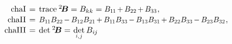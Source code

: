 \vspace{-0.25em}
\begin{equation}\label{invariants:2}
\begin{array}{r@{\hspace{.4em}}c@{\hspace{.4em}}l}
\firstcharacteristicinvariant
& = &
\trace{\somebivalenttensor} = \somebivalenttensorcomponents{kk}
= \scalebox{.92}[.96]{$%
\somebivalenttensorcomponents{1\hspace{-0.1ex}1}
\hspace{-0.2ex} + \hspace{-0.1ex}
\somebivalenttensorcomponents{22}
\hspace{-0.2ex} + \hspace{-0.1ex}
\somebivalenttensorcomponents{33} $}
\hspace{.1ex} ,
\\[.1em]
%
\secondcharacteristicinvariant
& = &
\scalebox{.92}[.96]{$ \somebivalenttensorcomponents{1\hspace{-0.1ex}1} \somebivalenttensorcomponents{22}
\hspace{-0.2ex} - \hspace{-0.1ex}
\somebivalenttensorcomponents{12} \somebivalenttensorcomponents{21}
\hspace{-0.2ex} + \hspace{-0.1ex}
\somebivalenttensorcomponents{1\hspace{-0.1ex}1} \somebivalenttensorcomponents{33}
\hspace{-0.2ex} - \hspace{-0.1ex}
\somebivalenttensorcomponents{13} \somebivalenttensorcomponents{31}
\hspace{-0.2ex} + \hspace{-0.1ex}
\somebivalenttensorcomponents{22} \somebivalenttensorcomponents{33}
\hspace{-0.2ex} - \hspace{-0.1ex}
\somebivalenttensorcomponents{23} \somebivalenttensorcomponents{32} $}
\hspace{.1ex} ,
\\[.1em]
%
\thirdcharacteristicinvariant
& = &
\operatorname{det} \hspace{.1ex} \somebivalenttensor
= \hspace{.15ex}
\underset{\raisebox{.15em}{%
   \scalebox{.7}{ $i$,$\hspace{.15ex}j$ }%
}}%
{\operatorname{det}} \, \somebivalenttensorcomponents{i\hspace{-0.1ex}j} \hspace{-0.15ex}

\end{array}
\end{equation}
